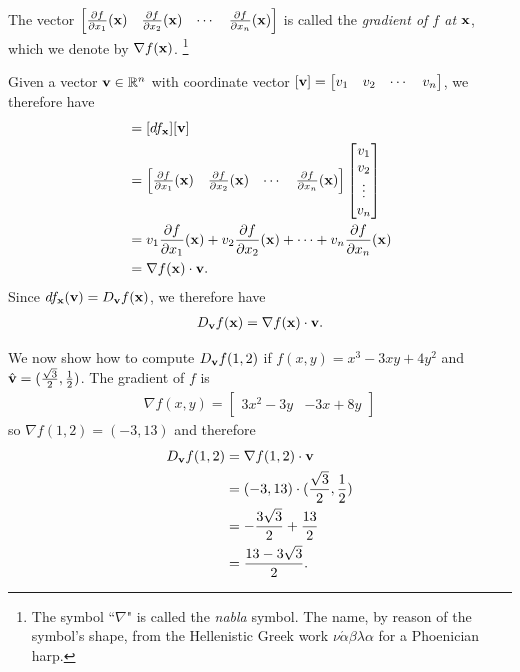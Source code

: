 \documentclass[12pt,letterpaper,reqno]{article}
\numberwithin{equation}{section}
\newcommand{\R}{\ensuremath{\mathbb R}}
\newcommand{\bv}{{\bf v}}
\newcommand{\bx}{{\bf x}}
\begin{document}
{\begin{defn}[Gradient]
	The vector $\begin{bmatrix}
		\frac{\partial f}{\partial x_1}(\bx) & \frac{\partial f}{\partial x_2}(\bx) & \cdots & \frac{\partial f}{\partial x_n}(\bx)
	\end{bmatrix}$ is called the \emph{gradient of $f$ at $\bx$}, which we denote by $\nabla f(\bx)$. \footnote{The symbol ``$\nabla$" is called the \emph{nabla} symbol. The name, by reason of the symbol's shape, from the Hellenistic Greek work $\nu \acute{\alpha} \beta \lambda \alpha$ for a Phoenician harp.}
\end{defn}
Given a vector $\bv \in \R^n$ with coordinate vector $[\bv]=\begin{bmatrix}
	v_1 & v_2 & \cdots & v_n
\end{bmatrix}$, we therefore have
\begin{align*}
	[df_\bx(\bv)]&=[df_\bx][\bv] \\
	&=\begin{bmatrix}
		\frac{\partial f}{\partial x_1}(\bx) & \frac{\partial f}{\partial x_2}(\bx) & \cdots & \frac{\partial f}{\partial x_n}(\bx)
	\end{bmatrix} \begin{bmatrix}
	v_1 \\ v_2 \\ \vdots \\ v_n
\end{bmatrix} \\
&=v_1\frac{\partial f}{\partial x_1}(\bx)+v_2\frac{\partial f}{\partial x_2}(\bx)+\cdots+v_n\frac{\partial f}{\partial x_n}(\bx) \\
&=\nabla f(\bx) \cdot \bv.
\end{align*}
Since $df_\bx(\bv)=D_\bv f(\bx)$, we therefore have
\begin{align}\label{eq:dd_dot}
	D_\bv f(\bx)=\nabla f(\bx) \cdot \bv.
\end{align}

\begin{example}
We now show how to compute $D_{\bv}f(1,2)$ if  $f(x,y)=x^3-3xy+4y^2$ and $\hat{\bv}=(\frac{\sqrt{3}}{2},\frac{1}{2})$.	 The gradient of $f$ is 
\begin{align*}
	\nabla f(x,y)=\begin{bmatrix}
		3x^2-3y & -3x+8y
	\end{bmatrix}
\end{align*}
so $\nabla f(1,2)=(-3,13)$ and therefore
\begin{align*}
	D_\bv f(1,2)&=\nabla f(1,2) \cdot \bv \\
	&=(-3,13) \cdot (\frac{\sqrt{3}}{2},\frac{1}{2}) \\
	&=-\frac{3\sqrt{3}}{2}+\frac{13}{2} \\
	&=\frac{13-3\sqrt{3}}{2}.
\end{align*}
\end{example}

}
\end{document}
